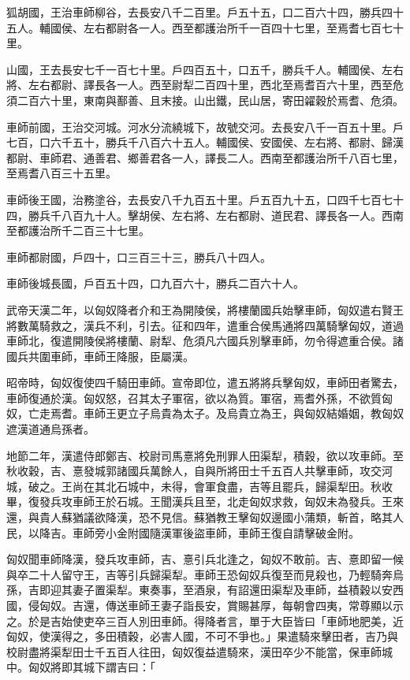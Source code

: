 \begin{pinyinscope}
狐胡國，王治車師柳谷，去長安八千二百里。戶五十五，口二百六十四，勝兵四十五人。輔國侯、左右都尉各一人。西至都護治所千一百四十七里，至焉耆七百七十里。

山國，王去長安七千一百七十里。戶四百五十，口五千，勝兵千人。輔國侯、左右將、左右都尉、譯長各一人。西至尉犁二百四十里，西北至焉耆百六十里，西至危須二百六十里，東南與鄯善、且末接。山出鐵，民山居，寄田糴穀於焉耆、危須。

車師前國，王治交河城。河水分流繞城下，故號交河。去長安八千一百五十里。戶七百，口六千五十，勝兵千八百六十五人。輔國侯、安國侯、左右將、都尉、歸漢都尉、車師君、通善君、鄉善君各一人，譯長二人。西南至都護治所千八百七里，至焉耆八百三十五里。

車師後王國，治務塗谷，去長安八千九百五十里。戶五百九十五，口四千七百七十四，勝兵千八百九十人。擊胡侯、左右將、左右都尉、道民君、譯長各一人。西南至都護治所千二百三十七里。

車師都尉國，戶四十，口三百三十三，勝兵八十四人。

車師後城長國，戶百五十四，口九百六十，勝兵二百六十人。

武帝天漢二年，以匈奴降者介和王為開陵侯，將樓蘭國兵始擊車師，匈奴遣右賢王將數萬騎救之，漢兵不利，引去。征和四年，遣重合侯馬通將四萬騎擊匈奴，道過車師北，復遣開陵侯將樓蘭、尉犁、危須凡六國兵別擊車師，勿令得遮重合侯。諸國兵共圍車師，車師王降服，臣屬漢。

昭帝時，匈奴復使四千騎田車師。宣帝即位，遣五將將兵擊匈奴，車師田者驚去，車師復通於漢。匈奴怒，召其太子軍宿，欲以為質。軍宿，焉耆外孫，不欲質匈奴，亡走焉耆。車師王更立子烏貴為太子。及烏貴立為王，與匈奴結婚姻，教匈奴遮漢道通烏孫者。

地節二年，漢遣侍郎鄭吉、校尉司馬憙將免刑罪人田渠犁，積穀，欲以攻車師。至秋收穀，吉、憙發城郭諸國兵萬餘人，自與所將田士千五百人共擊車師，攻交河城，破之。王尚在其北石城中，未得，會軍食盡，吉等且罷兵，歸渠犁田。秋收畢，復發兵攻車師王於石城。王聞漢兵且至，北走匈奴求救，匈奴未為發兵。王來還，與貴人蘇猶議欲降漢，恐不見信。蘇猶教王擊匈奴邊國小蒲類，斬首，略其人民，以降吉。車師旁小金附國隨漢軍後盜車師，車師王復自請擊破金附。

匈奴聞車師降漢，發兵攻車師，吉、憙引兵北逢之，匈奴不敢前。吉、憙即留一候與卒二十人留守王，吉等引兵歸渠犁。車師王恐匈奴兵復至而見殺也，乃輕騎奔烏孫，吉即迎其妻子置渠犁。東奏事，至酒泉，有詔還田渠犁及車師，益積穀以安西國，侵匈奴。吉還，傳送車師王妻子詣長安，賞賜甚厚，每朝會四夷，常尊顯以示之。於是吉始使吏卒三百人別田車師。得降者言，單于大臣皆曰「車師地肥美，近匈奴，使漢得之，多田積穀，必害人國，不可不爭也。」果遣騎來擊田者，吉乃與校尉盡將渠犁田士千五百人往田，匈奴復益遣騎來，漢田卒少不能當，保車師城中。匈奴將即其城下謂吉曰：「


\end{pinyinscope}
